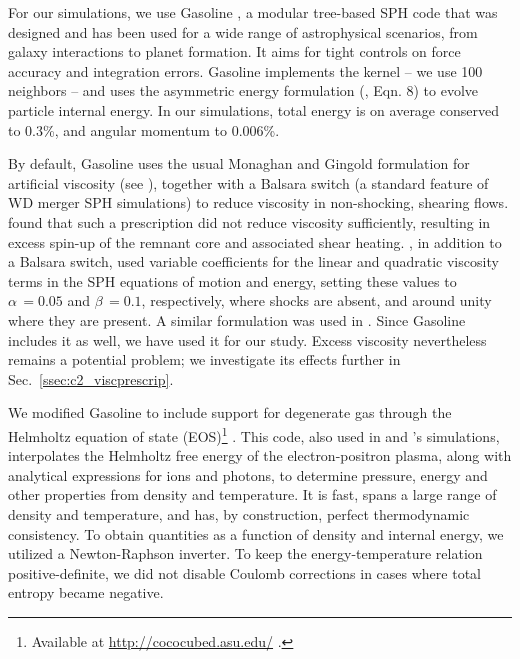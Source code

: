 For our simulations, we use Gasoline \citep{wadssq04}, a modular tree-based SPH code that was designed and has been used for a wide range of astrophysical scenarios, from galaxy interactions to planet formation.  It aims for tight controls on force accuracy and integration errors.  Gasoline implements the \cite{hernk89} kernel -- we use 100 neighbors -- and uses the asymmetric energy formulation (\citealt{wadssq04}, Eqn. 8) to evolve particle internal energy.  In our simulations, total energy is on average conserved to 0.3\%, and angular momentum to 0.006\%.

By default, Gasoline uses the usual Monaghan and Gingold formulation for artificial viscosity (see \citealt{mona05}), together with a Balsara switch (a standard feature of WD merger SPH simulations) to reduce viscosity in non-shocking, shearing flows.  \cite{guerig04} found that such a prescription did not reduce viscosity sufficiently, resulting in excess spin-up of the remnant core and associated shear heating.  \cite{yoonpr07}, in addition to a Balsara switch, used variable coefficients for the linear and quadratic viscosity terms in the SPH equations of motion and energy, setting these values to $\alpha\,=0.05$ and $\beta\,=0.1$, respectively, where shocks are absent, and around unity where they are present.  A similar formulation was used in \cite{dan+11,dan+12}.  Since Gasoline includes it as well, we have used it for our study.  Excess viscosity nevertheless remains a potential problem;  we investigate its effects further in Sec.~\ref{ssec:c2_viscprescrip}.

We modified Gasoline to include support for degenerate gas through the Helmholtz equation of state (EOS)\footnote{Available at \url{http://cococubed.asu.edu/} .} \citep{timms00}.  This code, also used in \cite{rask+12} and \cite{dan+12}'s simulations, interpolates the Helmholtz free energy of the electron-positron plasma, along with analytical expressions for ions and photons, to determine pressure, energy and other properties from density and temperature.  It is fast, spans a large range of density and temperature, and has, by construction, perfect thermodynamic consistency.  To obtain quantities as a function of density and internal energy, we utilized a Newton-Raphson inverter.  To keep the energy-temperature relation positive-definite, we did not disable Coulomb corrections in cases where total entropy became negative.



